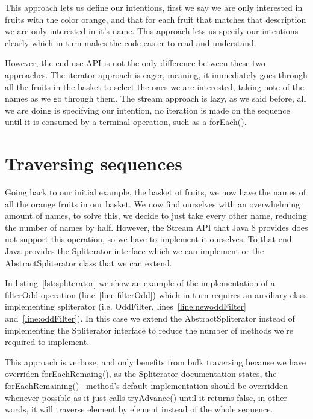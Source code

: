 

This approach lets us define our intentions, first we say we are only interested in fruits with the color orange, and that for each fruit that matches that description we are only interested in it's name. This approach lets us specify our intentions clearly which in turn makes the code easier to read and understand. 

However, the end use API is not the only difference between these two approaches. The iterator approach is eager, meaning, it immediately goes through all the fruits in the basket to select the ones we are interested, taking note of the names as we go through them. The stream approach is lazy, as we said before, all we are doing is specifying our intention, no iteration is made on the sequence until it is consumed by a terminal operation, such as a forEach().

\section{Traversing sequences}

Going back to our initial example, the basket of fruits, we now have the names of all the orange fruits in our basket. We now find ourselves with an overwhelming amount of names, to solve this, we decide to just take every other name, reducing the number of names by half. However, the Stream API that Java 8 provides does not support this operation, so we have to implement it ourselves. To that end Java provides the Spliterator interface which we can implement or the AbstractSpliterator class that we can extend.

In listing~\ref{lst:spliterator} we show an example of the implementation of a filterOdd operation (line~\ref{line:filterOdd}) which in turn requires an auxiliary class implementing spliterator (i.e. OddFilter, lines~\ref{line:newoddFilter} and~\ref{line:oddFilter}). In this case we extend the AbstractSpliterator instead of implementing the Spliterator interface to reduce the number of methods we're required to implement.




This approach is verbose, and only benefits from bulk traversing because we have overriden forEachRemaing(), as the Spliterator documentation states, the forEachRemaining()~\citep{spliterator} method's default implementation should be overridden whenever possible as it just calls tryAdvance() until it returns false, in other words, it will traverse element by element instead of the whole sequence. 

